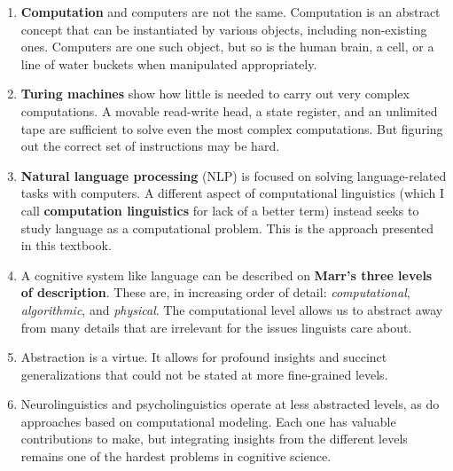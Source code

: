 \begin{insights}
    \begin{enumerate}
        \item \textbf{Computation} and computers are not the same.
              Computation is an abstract concept that can be instantiated by various objects, including non-existing ones.
              Computers are one such object, but so is the human brain, a cell, or a line of water buckets when manipulated appropriately.
        \item \textbf{Turing machines} show how little is needed to carry out very complex computations.
              A movable read-write head, a state register, and an unlimited tape are sufficient to solve even the most complex computations.
              But figuring out the correct set of instructions may be hard.
        \item \textbf{Natural language processing} (NLP) is focused on solving language-related tasks with computers.
              A different aspect of computational linguistics (which I call \textbf{computation linguistics} for lack of a better term) instead seeks to study language as a computational problem.
              This is the approach presented in this textbook.
        \item A cognitive system like language can be described on \textbf{Marr's three levels of description}.
              These are, in increasing order of detail: \emph{computational}, \emph{algorithmic}, and \emph{physical}.
              The computational level allows us to abstract away from many details that are irrelevant for the issues linguists care about.
        \item Abstraction is a virtue.
              It allows for profound insights and succinct generalizations that could not be stated at more fine-grained levels.
        \item Neurolinguistics and psycholinguistics operate at less abstracted levels, as do approaches based on computational modeling.
              Each one has valuable contributions to make, but integrating insights from the different levels remains one of the hardest problems in cognitive science.
    \end{enumerate}
\end{insights}

